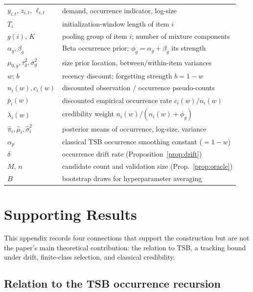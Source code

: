 \documentclass[twoside]{article}
\theoremstyle{definition}
\begin{document}
\begin{table}[h]
\centering
\small
\begin{tabular}{ll}
\toprule
$y_{i,t}$, $z_{i,t}$, $\ell_{i,t}$ & demand, occurrence indicator, log-size\\
$T_i$ & initialization-window length of item $i$\\
$g(i)$, $K$ & pooling group of item $i$; number of mixture components\\
$\alpha_g,\beta_g$ & Beta occurrence prior; $\phi_g=\alpha_g+\beta_g$ its strength\\
$\mu_{0,g},\tau^2_g,\sigma^2_g$ & size prior location, between/within-item variances\\
$w$; $b$ & recency discount; forgetting strength $b=1-w$\\
$n_i(w), c_i(w)$ & discounted observation / occurrence pseudo-counts\\
$\bar p_i(w)$ & discounted empirical occurrence rate $c_i(w)/n_i(w)$\\
$\lambda_i(w)$ & credibility weight $n_i(w)/(n_i(w)+\phi_g)$\\
$\hat\pi_i,\hat\mu_i,\hat\sigma^2_i$ & posterior means of occurrence, log-size, variance\\
$\alpha_p$ & classical TSB occurrence smoothing constant ($=1-w$)\\
$\delta$ & occurrence drift rate (Proposition~\ref{prop:drift})\\
$M$, $n$ & candidate count and validation size (Prop.~\ref{prop:oracle})\\
$B$ & bootstrap draws for hyperparameter averaging\\
\bottomrule
\end{tabular}
\end{table}

\section{Supporting Results}\label{app:supporting}

This appendix records four connections that support the construction but
are not the paper's main theoretical contribution: the relation to TSB,
a tracking bound under drift, finite-class selection, and classical
credibility.

\subsection{Relation to the TSB occurrence recursion}
\end{document}
